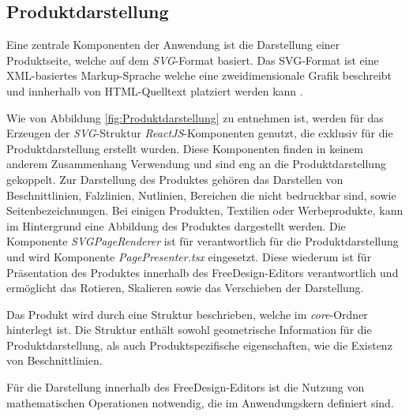 \subsection{Produktdarstellung}
Eine zentrale Komponenten der Anwendung ist die Darstellung einer Produktseite, welche auf dem \emph{SVG}-Format basiert.
Das SVG-Format ist eine XML-basiertes Markup-Sprache welche eine zweidimensionale Grafik beschreibt und innherhalb von HTML-Quelltext platziert werden kann \autocite[vgl.][]{AboutSVG}. 

Wie von Abbildung \ref{fig:Produktdarstellung} zu entnehmen ist, werden für das Erzeugen der \emph{SVG}-Struktur \emph{ReactJS}-Komponenten genutzt, die exklusiv für die Produktdarstellung erstellt wurden. Diese Komponenten finden in keinem anderem Zusammenhang Verwendung und sind eng an die Produktdarstellung gekoppelt. 
Zur Darstellung des Produktes gehören das Darstellen von Beschnittlinien, Falzlinien, Nutlinien, Bereichen die nicht bedruckbar sind, sowie Seitenbezeichnungen. Bei einigen Produkten, Textilien oder Werbeprodukte, kann im Hintergrund eine Abbildung des Produktes dargestellt werden. Die Komponente \emph{SVGPageRenderer} ist für verantwortlich für die Produktdarstellung und wird Komponente \emph{PagePresenter.tsx} eingesetzt. Diese wiederum ist für Präsentation des Produktes innerhalb des FreeDesign-Editors verantwortlich und ermöglicht das Rotieren, Skalieren sowie das Verschieben der Darstellung. 


Das Produkt wird durch eine Struktur beschrieben, welche im \emph{core}-Ordner hinterlegt ist. Die Struktur enthält sowohl geometrische Information für die Produktdarstellung, als auch Produktspezifische eigenschaften, wie die Existenz von Beschnittlinien. 

Für die Darstellung innerhalb des FreeDesign-Editors ist die Nutzung von mathematischen Operationen notwendig, die im Anwendungskern definiert sind. 

